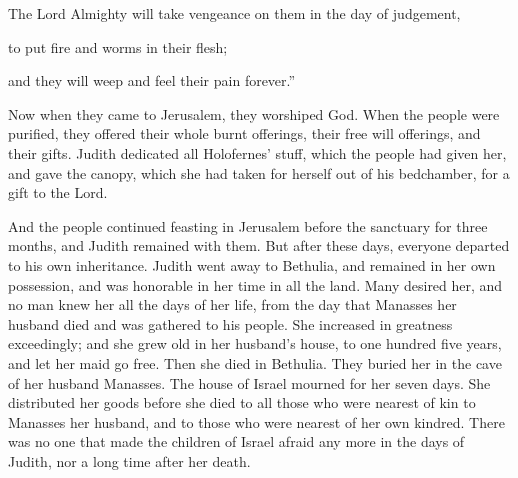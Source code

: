 {\par }{\QB The Lord Almighty will take vengeance on them in the day of judgement,
\par }{\Q to put fire and worms in their flesh;
\par }{\Q and they will weep and feel their pain forever.”
\par }{\PP {}Now when they came to Jerusalem, they worshiped God. When the people were purified, they offered their whole burnt offerings, their free will offerings, and their gifts.
Judith dedicated all Holofernes’ stuff, which the people had given her, and gave the canopy, which she had taken for herself out of his bedchamber, for a gift to the Lord.
\par }{\PP {}And the people continued feasting in Jerusalem before the sanctuary for three months, and Judith remained with them.
But after these days, everyone departed to his own inheritance. Judith went away to Bethulia, and remained in her own possession, and was honorable in her time in all the land.
Many desired her, and no man knew her all the days of her life, from the day that Manasses her husband died and was gathered to his people.
She increased in greatness exceedingly; and she grew old in her husband’s house, to one hundred five years, and let her maid go free. Then she died in Bethulia. They buried her in the cave of her husband Manasses.
The house of Israel mourned for her seven days. She distributed her goods before she died to all those who were nearest of kin to Manasses her husband, and to those who were nearest of her own kindred.
There was no one that made the children of Israel afraid any more in the days of Judith, nor a long time after her death.
\par }